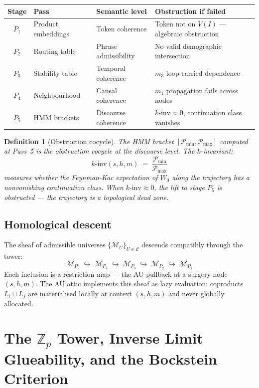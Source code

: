 \documentclass[11pt,a4paper]{article}
\newtheorem{definition}[theorem]{Definition}
\newcommand{\Mfld}{\mathcal{M}}
\begin{document}
\begin{center}
\renewcommand{\arraystretch}{1.3}
\begin{tabular}{cllp{4cm}}
\toprule
Stage & Pass & Semantic level & Obstruction if failed \\
\midrule
$P_1$ & Product embeddings & Token coherence &
  Token not on $V(I)$ --- algebraic obstruction \\
$P_2$ & Routing table & Phrase admissibility &
  No valid demographic intersection \\
$P_3$ & Stability table & Temporal coherence &
  $m_3$ loop-carried dependence \\
$P_4$ & Neighbourhood & Causal coherence &
  $m_1$ propagation fails across nodes \\
$P_5$ & HMM brackets & Discourse coherence &
  $k\text{-inv} \approx 0$, continuation class vanishes \\
\bottomrule
\end{tabular}
\end{center}

\begin{definition}[Obstruction cocycle]
The HMM bracket $[\mathcal{P}_{\min}, \mathcal{P}_{\max}]$
computed at Pass~5 is the obstruction cocycle at the discourse
level. The $k$-invariant:
\[
  k\text{-inv}(s,h,m) \;=\; \frac{\mathcal{P}_{\min}}{\mathcal{P}_{\max}}
\]
measures whether the Feynman-Kac expectation of $W_0$ along the
trajectory has a nonvanishing continuation class.
When $k\text{-inv} \approx 0$, the lift to stage $P_5$ is
obstructed --- the trajectory is a topological dead zone.
\end{definition}

\subsection{Homological descent}

The sheaf of admissible universes $\{\Mfld_U\}_{U \in \mathcal{C}}$
descends compatibly through the tower:
\[
  \Mfld_{P_5} \;\hookrightarrow\;
  \Mfld_{P_4} \;\hookrightarrow\;
  \Mfld_{P_3} \;\hookrightarrow\;
  \Mfld_{P_2} \;\hookrightarrow\;
  \Mfld_{P_1}
\]
Each inclusion is a restriction map --- the AU pullback at a
surgery node $(s,h,m)$. The AU attic implements this sheaf as
lazy evaluation: coproducts $L_i \sqcup L_j$ are materialised
locally at context $(s,h,m)$ and never globally allocated.

\section{The $\mathbb{Z}_p$ Tower, Inverse Limit Glueability, and the
         Bockstein Criterion}
\label{sec:zp-tower}
\end{document}
